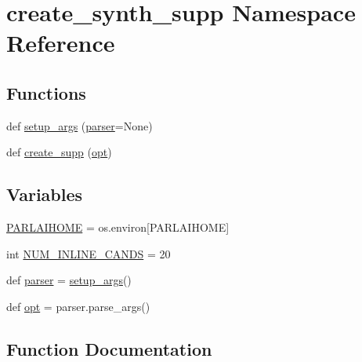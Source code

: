 \hypertarget{namespacecreate__synth__supp}{}\section{create\+\_\+synth\+\_\+supp Namespace Reference}
\label{namespacecreate__synth__supp}
\subsection*{Functions}
\begin{DoxyCompactItemize}
\item 
def \hyperlink{namespacecreate__synth__supp_a1d35bf34b52be13a73c4a7b9d2ba0274}{setup\+\_\+args} (\hyperlink{namespacecreate__synth__supp_a4b22ea23245fdb077c1626e7f43fdb0e}{parser}=None)
\item 
def \hyperlink{namespacecreate__synth__supp_a4ab3a83853f9e0e6a13b9db0d4aa79f0}{create\+\_\+supp} (\hyperlink{namespacecreate__synth__supp_a06f3a67a05e6d1059e18e113b96fb948}{opt})
\end{DoxyCompactItemize}
\subsection*{Variables}
\begin{DoxyCompactItemize}
\item 
\hyperlink{namespacecreate__synth__supp_a0cda4b2163469f9258509512b04fe9f6}{P\+A\+R\+L\+A\+I\+H\+O\+ME} = os.\+environ\mbox{[}\textquotesingle{}P\+A\+R\+L\+A\+I\+H\+O\+ME\textquotesingle{}\mbox{]}
\item 
int \hyperlink{namespacecreate__synth__supp_a61d0a0fd87c2f85699422e6fd9ccfe96}{N\+U\+M\+\_\+\+I\+N\+L\+I\+N\+E\+\_\+\+C\+A\+N\+DS} = 20
\item 
def \hyperlink{namespacecreate__synth__supp_a4b22ea23245fdb077c1626e7f43fdb0e}{parser} = \hyperlink{namespacecreate__synth__supp_a1d35bf34b52be13a73c4a7b9d2ba0274}{setup\+\_\+args}()
\item 
def \hyperlink{namespacecreate__synth__supp_a06f3a67a05e6d1059e18e113b96fb948}{opt} = parser.\+parse\+\_\+args()
\end{DoxyCompactItemize}


\subsection{Function Documentation}
\mbox{\label{namespacecreate__synth__supp_a4ab3a83853f9e0e6a13b9db0d4aa79f0}} 
